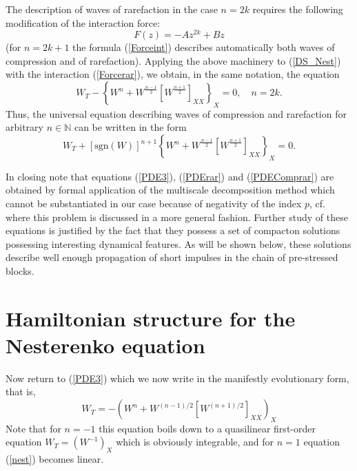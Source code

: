 \documentclass[12pt]{article}
\begin{document}
The description of waves of rarefaction in the case $n=2 k$ requires the following modification of the interaction force:
\begin{equation}\label{Forcerar}
F(z)=-A z^{2 k}+B z
\end{equation}
(for $n=2 k+1$ the formula (\ref{Forceint}) describes automatically both waves of compression and of rarefaction). Applying the above machinery to (\ref{DS_Nest}) with the interaction (\ref{Forcerar}), we obtain, in the same notation, the equation
\begin{equation}\label{PDErar}
W_T-\left\{W^n+ W^\frac{n-1}{2} \left[W^\frac{n+1}{2}  \right]_{XX}  \right\}_{X}=0, \quad n=2 k.
\end{equation}
Thus,  the universal equation describing waves of compression and rarefaction for arbitrary $n \in \mathbb{N}$ can be written  in the form
\begin{equation}\label{PDEComprar}
W_{ T}+\left[\mathrm{sgn}(W)\right]^{n+1} \left\{W^n+ W^\frac{n-1}{2} \left[W^\frac{n+1}{2}  \right]_{XX}  \right\}_{X}=0.
\end{equation}


In closing note that equations  (\ref{PDE3}), (\ref{PDErar}) and (\ref{PDEComprar}) are obtained by formal application of the multiscale decomposition method which cannot be substantiated in our case because of negativity of the index $p$, cf.\ \cite{Rosenau_03} where this problem is discussed in a more general fashion. Further study of these equations is justified  by the fact that  they possess a  set of compacton  solutions possessing interesting dynamical features. As will be shown below, these solutions describe well enough propagation of short impulses in the chain of pre-stressed blocks.




\section{Hamiltonian structure for the Nesterenko equation}\label{sec:hs}




Now return to (\ref{PDE3}) which we now write in the manifestly evolutionary form, that is,
\begin{equation}\label{nest}
W_T=-\left(W^n+W^{(n-1)/2} \left[W^{(n+1)/2}  \right ]_{XX}  \right)_X
\end{equation}
Note that for $n=-1$ this equation boils down to a quasilinear first-order equation $W_T=(W^{-1})_X$ which is obviously integrable, and for $n=1$ equation (\ref{nest}) becomes linear.
\end{document}
